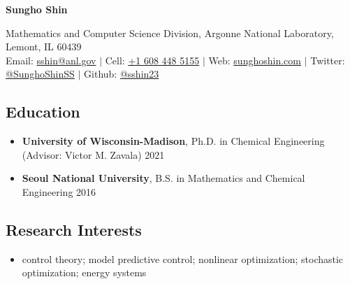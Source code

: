 \documentclass[letterpaper, 11pt]{article}
\begin{document}
\thispagestyle{empty}
\begin{center}
  {\bf\Large Sungho Shin}
\end{center}
\begin{center}
  {Mathematics and Computer Science Division}, {Argonne National Laboratory}, Lemont, IL 60439\\
  Email: \href{mailto:sshin@anl.gov}{sshin@anl.gov} $|$ Cell: \href{tel:16084485155}{+1 608 448 5155} $|$ Web: \href{https://sunghoshin.com}{sunghoshin.com} $|$ Twitter: \href{https://twitter.com/SunghoShinSS}{@SunghoShinSS} $|$ Github: \href{https://github.com/sshin23}{@sshin23}
\end{center}

\subsection*{Education}
\begin{itemize}[leftmargin=*,itemsep=0em]
\item[]{\bf University of Wisconsin-Madison}, {Ph.D. in Chemical Engineering} (Advisor: Victor M. Zavala) \hfill 2021
\item[]{\bf Seoul National University}, {B.S. in Mathematics} and {Chemical Engineering} \hfill 2016
\end{itemize}

\subsection*{Research Interests}
\begin{itemize}[leftmargin=*]
\item[] control theory; model predictive control; nonlinear optimization; stochastic optimization; energy systems
\end{itemize}
\end{document}
